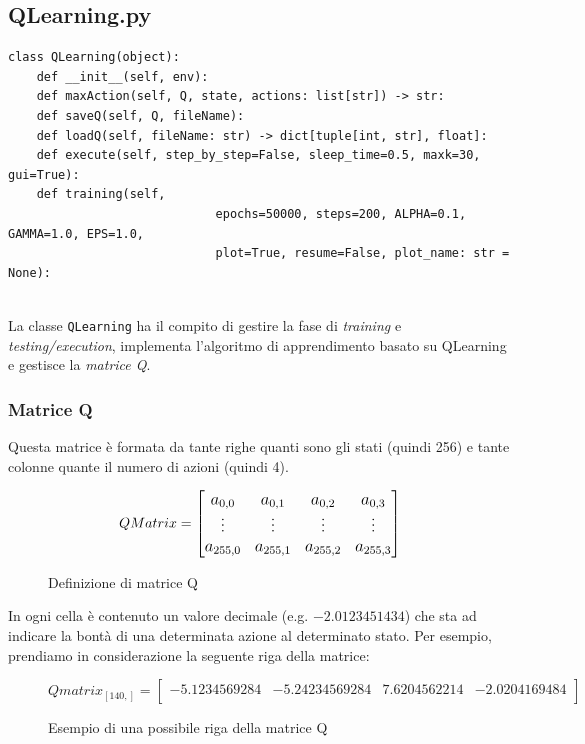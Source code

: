 \subsection{QLearning.py}

\begin{lstlisting}[style=python, caption={Metodi di QLearning.py}]
class QLearning(object):
	def __init__(self, env):
	def maxAction(self, Q, state, actions: list[str]) -> str:
	def saveQ(self, Q, fileName):
	def loadQ(self, fileName: str) -> dict[tuple[int, str], float]:
	def execute(self, step_by_step=False, sleep_time=0.5, maxk=30, gui=True):
	def training(self, 
							 epochs=50000, steps=200, ALPHA=0.1, GAMMA=1.0, EPS=1.0, 
							 plot=True, resume=False, plot_name: str = None):
	
\end{lstlisting}

La classe \lstinline[style=cmd]|QLearning| ha il compito di gestire la fase di \textit{training} e \textit{testing/execution}, implementa l'algoritmo di apprendimento basato su QLearning e gestisce la \textit{matrice Q}.

\subsubsection{Matrice Q}
\label{sec:matriceQ}

Questa matrice \`{e} formata da tante righe quanti sono gli stati (quindi 256) e tante colonne quante il numero di azioni (quindi 4).

\begin{figure}[H]
	\begin{equation*}
		\large
		QMatrix =
		\begin{bmatrix}
			a_{0,0} & a_{0,1} & a_{0,2} & a_{0,3} \\
			\vdots & \vdots & \vdots & \vdots \\
			a_{255,0} & a_{255,1} & a_{255,2} & a_{255,3}
		\end{bmatrix}
	\end{equation*}
	\caption{Definizione di matrice Q}
\end{figure}

In ogni cella \`{e} contenuto un valore decimale (e.g. $-2.0123451434$) che sta ad indicare la bont\`{a} di una determinata azione al determinato stato. Per esempio, prendiamo in considerazione la seguente riga della matrice:

\begin{figure}[H]
	\begin{equation*}
		Qmatrix_{[140,]} =
		\begin{bmatrix}
			-5.1234569284 & -5.24234569284 & 7.6204562214 & -2.0204169484\\
		\end{bmatrix}
	\end{equation*}
	\caption{Esempio di una possibile riga della matrice Q}
\end{figure}

